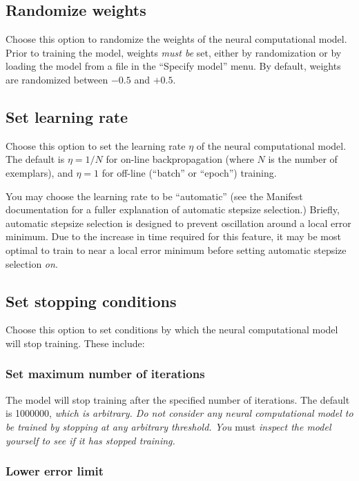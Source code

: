 \subsection{Randomize weights}

Choose this option to randomize the weights of the neural
computational model.  Prior to training the model, weights {\em must
be} set, either by randomization or by loading the model from a file
in the ``Specify model'' menu.  By default, weights are randomized
between $-0.5$ and $+0.5$.

\subsection{Set learning rate}

Choose this option to set the learning rate $\eta$ of the neural
computational model.  The default is $\eta = 1/N$ for on-line
backpropagation (where $N$ is the number of exemplars), and $\eta = 1$
for off-line (``batch'' or ``epoch'') training.

You may choose the learning rate to be ``automatic'' (see the Manifest
documentation for a fuller explanation of automatic stepsize
selection.) Briefly, automatic stepsize selection is designed to
prevent oscillation around a local error minimum.  Due to the increase
in time required for this feature, it may be most optimal to train to
near a local error minimum before setting automatic stepsize selection
{\em on}.

\subsection{Set stopping conditions}

Choose this option to set conditions by which the neural computational
model will stop training.  These include:

\subsubsection{Set maximum number of iterations}

The model will stop training after the specified number of iterations.
The default is 1000000, {\em which is arbitrary.  Do not consider any
neural computational model to be trained by stopping at any arbitrary
threshold.  You} must {\em inspect the model yourself to see if it has
stopped training.}

\subsubsection{Lower error limit}

